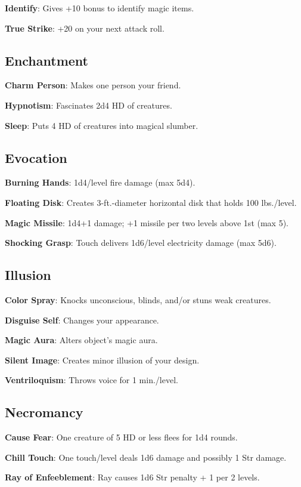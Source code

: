 \textbf{Identify}: Gives +10 bonus to identify magic items.

\textbf{True Strike}: +20 on your next attack roll.

\subsection{Enchantment}


\textbf{Charm Person}: Makes one person your friend.

\textbf{Hypnotism}: Fascinates 2d4 HD of creatures.

\textbf{Sleep}: Puts 4 HD of creatures into magical slumber.

\subsection{Evocation}


\textbf{Burning Hands}: 1d4/level fire damage (max 5d4).

\textbf{Floating Disk}: Creates 3-ft.-diameter horizontal disk that holds 100 lbs./level.

\textbf{Magic Missile}: 1d4+1 damage; +1 missile per two levels above 1st (max 5).

\textbf{Shocking Grasp}: Touch delivers 1d6/level electricity damage (max 5d6).

\subsection{Illusion}


\textbf{Color Spray}: Knocks unconscious, blinds, and/or stuns weak creatures.

\textbf{Disguise Self}: Changes your appearance.

\textbf{Magic Aura}: Alters object's magic aura.

\textbf{Silent Image}: Creates minor illusion of your design.

\textbf{Ventriloquism}: Throws voice for 1 min./level.

\subsection{Necromancy}


\textbf{Cause Fear}: One creature of 5 HD or less flees for 1d4 rounds.

\textbf{Chill Touch}: One touch/level deals 1d6 damage and possibly 1 Str damage.

\textbf{Ray of Enfeeblement}: Ray causes 1d6 Str penalty + 1 per 2 levels.

